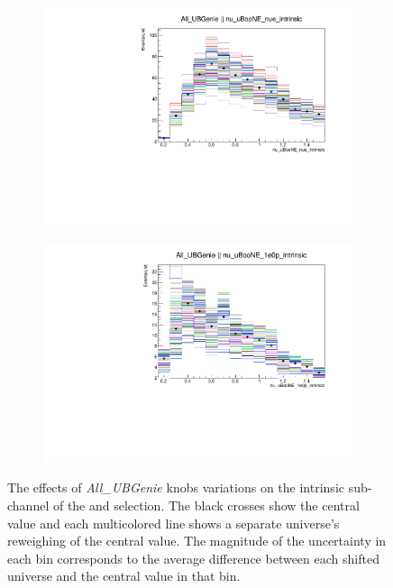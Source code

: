 \begin{figure}[H] 
    \begin{center}
    \begin{subfigure}[b]{0.48\textwidth}
    \includegraphics[width=1.00\textwidth]{Systematics/systvariations/BDT/Variation_nue_1e0p_numu_reco_e_H1_mc_collab_All_UBGenie_nu_uBooNE_nue_intrinsic_1D.pdf}
    \end{subfigure}
    \begin{subfigure}[b]{0.48\textwidth}
    \includegraphics[width=1.00\textwidth]{Systematics/systvariations/BDT/Variation_nue_1e0p_numu_reco_e_H1_mc_collab_All_UBGenie_nu_uBooNE_1e0p_intrinsic_1D.pdf}
    \end{subfigure}
\caption{\label{fig:geniesystvars} The effects of \textit{All\_UBGenie} knobs variations on the intrinsic \nue sub-channel of the \npsel and \zpsel selection. The black crosses show the central value and each multicolored line shows a separate universe's reweighing of the central value. The magnitude of the  uncertainty in each bin corresponds to the average difference between each shifted universe and the central value in that bin.} %
\end{center}
\end{figure}


